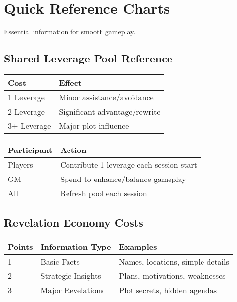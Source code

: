 \section{Quick Reference Charts}

Essential information for smooth gameplay.

\subsection{Shared Leverage Pool Reference}

\begin{center}
\begin{tabular}{|l|l|}
\hline
\textbf{Cost} & \textbf{Effect} \\
\hline
1 Leverage & Minor assistance/avoidance \\
2 Leverage & Significant advantage/rewrite \\
3+ Leverage & Major plot influence \\
\hline
\end{tabular}
\end{center}

\begin{center}
\begin{tabular}{|l|l|}
\hline
\textbf{Participant} & \textbf{Action} \\
\hline
Players & Contribute 1 leverage each session start \\
GM & Spend to enhance/balance gameplay \\
All & Refresh pool each session \\
\hline
\end{tabular}
\end{center}

\subsection{Revelation Economy Costs}

\begin{center}
\begin{tabular}{|l|l|l|}
\hline
\textbf{Points} & \textbf{Information Type} & \textbf{Examples} \\
\hline
1 & Basic Facts & Names, locations, simple details \\
2 & Strategic Insights & Plans, motivations, weaknesses \\
3 & Major Revelations & Plot secrets, hidden agendas \\
\hline
\end{tabular}
\end{center}

